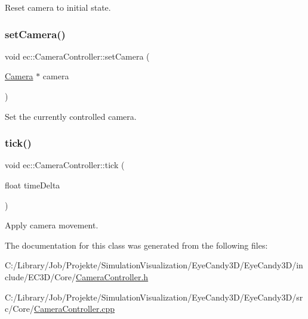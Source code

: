 Reset camera to initial state. 

\mbox{\label{classec_1_1_camera_controller_a74d3b80913b69dce0bae61a651c3b49b}} 
\subsubsection{\texorpdfstring{set\+Camera()}{setCamera()}}
{\footnotesize\ttfamily void ec\+::\+Camera\+Controller\+::set\+Camera (\begin{DoxyParamCaption}\item[{\mbox{\hyperlink{classec_1_1_camera}{Camera}} $\ast$}]{camera }\end{DoxyParamCaption})}



Set the currently controlled camera. 

\mbox{\label{classec_1_1_camera_controller_a82055ad6c8797937a8ec17234ab08758}} 
\subsubsection{\texorpdfstring{tick()}{tick()}}
{\footnotesize\ttfamily void ec\+::\+Camera\+Controller\+::tick (\begin{DoxyParamCaption}\item[{float}]{time\+Delta }\end{DoxyParamCaption})}



Apply camera movement. 



The documentation for this class was generated from the following files\+:\begin{DoxyCompactItemize}
\item 
C\+:/\+Library/\+Job/\+Projekte/\+Simulation\+Visualization/\+Eye\+Candy3\+D/\+Eye\+Candy3\+D/include/\+E\+C3\+D/\+Core/\mbox{\hyperlink{_camera_controller_8h}{Camera\+Controller.\+h}}\item 
C\+:/\+Library/\+Job/\+Projekte/\+Simulation\+Visualization/\+Eye\+Candy3\+D/\+Eye\+Candy3\+D/src/\+Core/\mbox{\hyperlink{_camera_controller_8cpp}{Camera\+Controller.\+cpp}}\end{DoxyCompactItemize}
